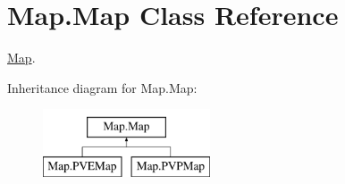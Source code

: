 \hypertarget{class_map_1_1_map}{}\section{Map.\+Map Class Reference}
\label{class_map_1_1_map}


\mbox{\hyperlink{class_map_1_1_map}{Map}}.  


Inheritance diagram for Map.\+Map\+:\begin{figure}[H]
\begin{center}
\leavevmode
\includegraphics[height=2.000000cm]{class_map_1_1_map}
\end{center}
\end{figure}
